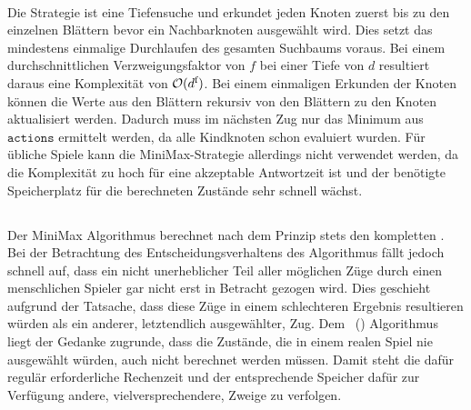 \vspace{0.5cm}\\ Die Strategie ist eine Tiefensuche und erkundet jeden Knoten zuerst bis zu den einzelnen Blättern bevor ein Nachbarknoten ausgewählt wird. Dies setzt das mindestens einmalige Durchlaufen des gesamten Suchbaums voraus. Bei einem durchschnittlichen Verzweigungsfaktor von $f$ bei einer Tiefe von $d$ resultiert daraus eine Komplexität von $\mathcal{O}(d\textsuperscript{f})$. Bei einem einmaligen Erkunden der Knoten können die Werte aus den Blättern rekursiv von den Blättern zu den Knoten aktualisiert werden. Dadurch muss im nächsten Zug nur das Minimum aus $\mathtt{actions}$ ermittelt werden, da alle Kindknoten schon evaluiert wurden. Für übliche Spiele kann die MiniMax-Strategie allerdings nicht verwendet werden, da die Komplexität zu hoch für eine akzeptable Antwortzeit ist und der benötigte Speicherplatz für die berechneten Zustände sehr schnell wächst.

\subsection{\abab}
\authormax
\label{ab-pruning}
Der MiniMax Algorithmus berechnet nach dem Prinzip  stets den kompletten \gtree. 
\\Bei der Betrachtung des Entscheidungsverhaltens des Algorithmus fällt jedoch schnell auf, dass ein nicht unerheblicher Teil aller möglichen Züge durch einen menschlichen Spieler gar nicht erst in Betracht gezogen wird. Dies geschieht aufgrund der Tatsache, dass diese Züge in einem schlechteren Ergebnis resultieren würden als ein anderer, letztendlich ausgewählter, Zug.\newline
Dem \abab\ (\abp) Algorithmus liegt der Gedanke zugrunde, dass die Zustände, die in einem realen Spiel nie ausgewählt würden, auch nicht berechnet werden müssen. Damit steht die dafür regulär erforderliche Rechenzeit und der entsprechende Speicher dafür zur Verfügung andere, vielversprechendere, Zweige zu verfolgen.
